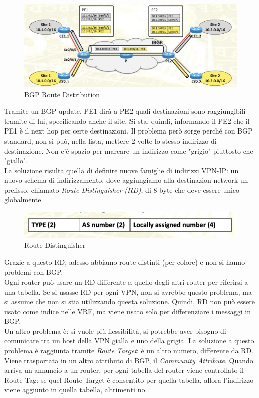 \documentclass{article}
\begin{document}
\begin{figure}[H]
    \centering
    \includegraphics[scale=0.6]{figures/BGP route distribution.png}
    \caption{BGP Route Distribution}
\end{figure}
\noindent Tramite un BGP update, PE1 dirà a PE2 quali destinazioni sono raggiungibili tramite di lui, specificando anche il site. Si sta, quindi, informando il PE2 che il PE1 è il next hop per certe destinazioni. Il problema però sorge perché con BGP standard, non si può, nella lista, mettere 2 volte lo stesso indirizzo di destinazione. Non c'è spazio per marcare un indirizzo come "grigio" piuttosto che "giallo". \\ La soluzione risulta quella di definire nuove famiglie di indirizzi VPN-IP: un nuovo schema di indirizzamento, dove aggiungiamo alla destinazion network un prefisso, chiamato \textit{Route Distinguisher (RD)}, di 8 byte che deve essere unico globalmente. 
\begin{figure}[H]
    \centering
    \includegraphics[scale=0.6]{figures/Route distinguisher.png}
    \caption{Route Distinguisher}
\end{figure}
Grazie a questo RD, adesso abbiamo route distinti (per colore) e non si hanno problemi con BGP. \\ Ogni router può usare un RD differente a quello degli altri router per riferirsi a una tabella. Se si usasse RD per ogni VPN, non si avrebbe questo problema, ma si assume che non si stia utilizzando questa soluzione. Quindi, RD non può essere usato come indice nelle VRF, ma viene usato solo per differenziare i messaggi in BGP. \\ Un altro problema è: si vuole più flessibilità, si potrebbe aver bisogno di comunicare tra un host della VPN gialla e uno della grigia. La soluzione a questo problema è raggiunta tramite \textit{Route Target}: è un altro numero, differente da RD. Viene trasportata in un altro attributo di BGP, il \textit{Community Attribute}. Quando arriva un annuncio a un router, per ogni tabella del router viene controllato il Route Tag: se quel Route Target è consentito per quella tabella, allora l'indirizzo viene aggiunto in quella tabella, altrimenti no. 
\end{document}
